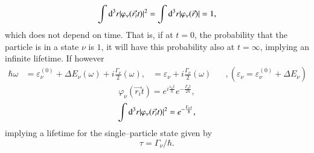 \begin{equation}
\int{\rm d}^3 r |\varphi_{\nu}(\vec{r_i}t)|^2 = \int{\rm d}^3 r |\varphi_{\nu}(\vec{r})| = 1 ,
\label{eqn:44}
\end{equation}
which does not depend on time. That is, if at $t=0$, the probability that the particle is in a state $\nu$ is $1$, it will have this probability also at $t=\infty$, implying an infinite lifetime. If however
\begin{eqnarray}
\nonumber
\hbar\omega &= \varepsilon_{\nu}^{(0)} + \Delta E_{\nu}(\omega) + i \frac{\Gamma_\nu}{2} (\omega),
\nonumber
&= \varepsilon_{\nu} + i \frac{\Gamma_{\nu}}{2}(\omega) \;\;\;\;\;\; , (\varepsilon_{\nu} = \varepsilon_{\nu}^{(0)} + \Delta E_{\nu})
\end{eqnarray}
\begin{equation}
\nonumber
\varphi_{\nu}(\vec{r_i} t) = e^{i \frac{\varepsilon_{\nu} t}{\hbar}} e^{- \frac{\Gamma_{\nu} t}{2\hbar}} ,
\end{equation}
\begin{equation}
\int{\rm d}^3 r |\varphi_{\nu} (\vec{r_i} t)|^2 = e^{- \frac{\Gamma_{\nu} t}{\hbar}} ,
\label{eqn:44b}
\end{equation}
implying a lifetime for the single--particle state given by
\begin{equation}
\tau = \Gamma_\nu/\hbar .
\label{eqn:45}
\end{equation}

